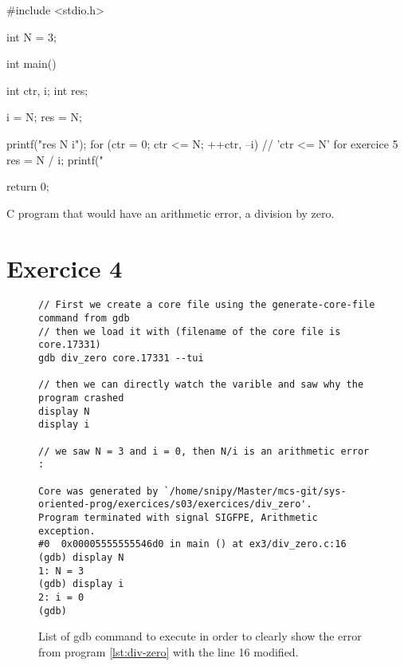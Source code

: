 \documentclass[a4paper,11pt]{report}
\begin{document}
\begin{listing}[ht]
\centering
\begin{clinecode}
#include <stdio.h>

int N = 3;

int main()
{
   int ctr, i;
   int res;

   i = N;
   res = N;

   printf("res  N  i\n");
   for (ctr = 0; ctr <= N; ++ctr, --i)
   { // 'ctr <= N' for exercice 5
      res = N / i;
      printf("%
   }

   return 0;
}
\end{clinecode}
\caption{C program that would have an arithmetic error, a division by zero.}
\label{lst:div-zero}
\end{listing}

\section*{Exercice 4}

\begin{figure}[ht]
  \centering
\begin{verbatim}
// First we create a core file using the generate-core-file command from gdb
// then we load it with (filename of the core file is core.17331)
gdb div_zero core.17331 --tui

// then we can directly watch the varible and saw why the program crashed
display N
display i

// we saw N = 3 and i = 0, then N/i is an arithmetic error :

Core was generated by `/home/snipy/Master/mcs-git/sys-oriented-prog/exercices/s03/exercices/div_zero'.
Program terminated with signal SIGFPE, Arithmetic exception.
#0  0x00005555555546d0 in main () at ex3/div_zero.c:16
(gdb) display N
1: N = 3
(gdb) display i
2: i = 0
(gdb) 
\end{verbatim}
  \caption{\label{fig:gdb-script} List of gdb command to execute in order to
    clearly show the error from program \ref{lst:div-zero} with the line 16
    modified.}
\end{figure}
\end{document}
